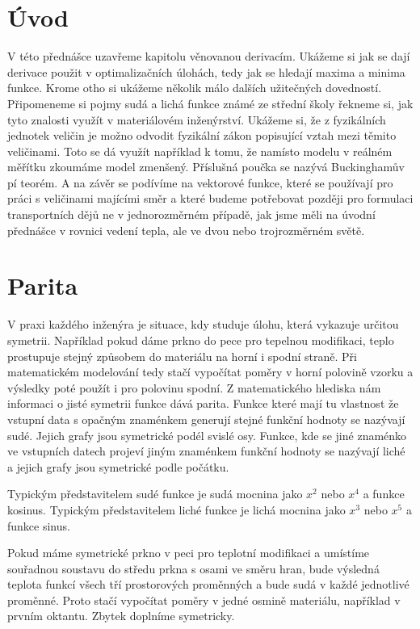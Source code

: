\documentclass[12pt]{article}
\begin{document}
\section*{Úvod}

V této přednášce uzavřeme kapitolu věnovanou derivacím. Ukážeme si jak se dají derivace použit v optimalizačních úlohách, tedy jak se hledají maxima a minima funkce. Krome otho si ukážeme několik málo dalších užitečných dovedností. Připomeneme si pojmy sudá a lichá funkce známé ze střední školy řekneme si, jak tyto znalosti využít v materiálovém inženýrství. Ukážeme si, že z fyzikálních jednotek veličin je možno odvodit fyzikální zákon popisující vztah mezi těmito veličinami. Toto se dá využít například k tomu, že namísto modelu v reálném měřítku zkoumáme model zmenšený. Příslušná poučka se nazývá Buckinghamův pí teorém. A na závěr se podívíme na vektorové funkce, které se používají pro práci s veličinami majícími směr a které budeme potřebovat později pro formulaci transportních dějů ne v jednorozměrném případě, jak jsme měli na úvodní přednášce v rovnici vedení tepla, ale ve dvou nebo trojrozměrném světě. 

\section*{Parita}

V praxi každého inženýra je situace, kdy studuje úlohu, která vykazuje určitou symetrii. Například pokud dáme prkno do pece pro tepelnou modifikaci, teplo prostupuje stejný způsobem do materiálu na horní i spodní straně. Při matematickém modelování tedy stačí vypočítat poměry v horní polovině vzorku a výsledky poté použít i pro polovinu spodní. Z matematického hlediska nám informaci o jisté symetrii funkce dává parita. Funkce které mají tu vlastnost že vstupní data s opačným znaménkem generují stejné funkční hodnoty se nazývají sudé. Jejich grafy jsou symetrické podél svislé osy. Funkce, kde se jiné znaménko ve vstupních datech projeví jiným znaménkem funkční hodnoty se nazývají liché a jejich grafy jsou symetrické podle počátku.

Typickým představitelem sudé funkce je sudá mocnina jako $x^2$ nebo $x^4$ a funkce kosinus. Typickým představitelem liché funkce je lichá mocnina jako $x^3$ nebo $x^5$ a funkce sinus.

Pokud máme symetrické prkno v peci pro teplotní modifikaci a umístíme souřadnou soustavu do středu prkna s osami ve směru hran, bude výsledná teplota funkcí všech tří prostorových proměnných a bude sudá v každé jednotlivé proměnné. Proto stačí vypočítat poměry v jedné osmině materiálu, například v prvním oktantu. Zbytek doplníme symetricky.
\end{document}
